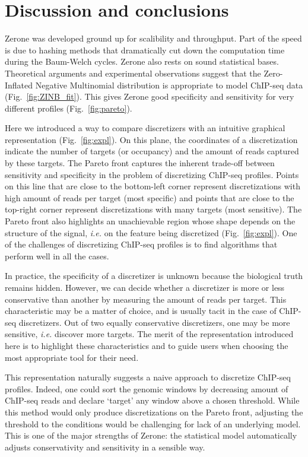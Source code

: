 \documentclass{bioinfo}
\begin{document}
\section{Discussion and conclusions}
Zerone was developed ground up for scalibility and throughput.
Part of the speed is due to hashing methods that dramatically
cut down the computation time during the Baum-Welch cycles. Zerone
also rests on sound statistical bases. Theoretical arguments and
experimental observations suggest that the Zero-Inflated Negative
Multinomial distribution is appropriate to model ChIP-seq data
(Fig.~\ref{fig:ZINB_fit}). This gives Zerone good specificity
and sensitivity for very different profiles (Fig.~\ref{fig:pareto}).

Here we introduced a way to compare discretizers with an intuitive
graphical representation (Fig.~\ref{fig:expl}). On this plane,
the coordinates of a discretization indicate the number of targets
(or occupancy) and the amount of reads captured by these targets.
The Pareto front captures the inherent trade-off between sensitivity
and specificity in the problem of discretizing ChIP-seq profiles.
Points on this line that are close to the bottom-left corner represent
discretizations with high amount of reads per target (most specific)
and points that are close to the top-right corner represent
discretizations with many targets (most sensitive). The Pareto front
also highlights an unachievable region whose shape depends on the
structure of the signal, \textit{i.e.} on the feature being discretized
(Fig.~\ref{fig:expl}). One of the challenges of discretizing ChIP-seq
profiles is to find algorithms that perform well in all the cases.

In practice, the specificity of a discretizer is unknown because
the biological truth remains hidden. However, we can decide whether
a discretizer is more or less conservative than another by measuring
the amount of reads per target. This characteristic may be a matter of
choice, and is usually tacit in the case of ChIP-seq discretizers.
Out of two equally conservative discretizers, one may be more sensitive,
\textit{i.e.} discover more targets. The merit of the representation
introduced here is to highlight these characteristics and to guide users
when choosing the most appropriate tool for their need.

This representation naturally suggests a naive approach to discretize
ChIP-seq profiles. Indeed, one could sort the genomic windows by
decreasing amount of ChIP-seq reads and declare `target' any window
above a chosen threshold. While this method would only produce
discretizations on the Pareto front, adjusting the threshold to the
conditions would be challenging for lack of an underlying model.
This is one of the major strengths of Zerone: the statistical model
automatically adjusts conservativity and sensitivity in a sensible way.
\end{document}
